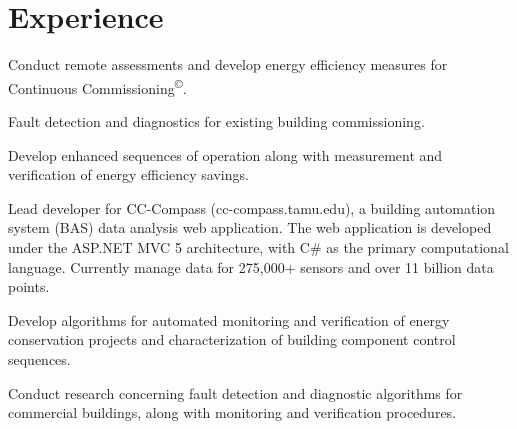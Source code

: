 \documentclass[]{deedy-resume-openfont}
\begin{document}
\begin{minipage}[t]{0.66\textwidth}


\section{Experience}

\sectionsep
\begin{tightemize}
\item Conduct remote assessments and develop energy efficiency measures for Continuous Commissioning\textsuperscript{\copyright{}}.
\item Fault detection and diagnostics for existing building commissioning.
\item Develop enhanced sequences of operation along with measurement and verification of energy efficiency savings.
\end{tightemize}

\vspace{0.1in}


\vspace{\topsep} %
\begin{tightemize}
\item Lead developer for CC-Compass (cc-compass.tamu.edu), a building automation system
(BAS) data analysis web application. The web application is developed under the ASP.NET
MVC 5 architecture, with C\# as the primary computational language. Currently manage
data for 275,000+ sensors and over 11 billion data points.
\item Develop algorithms for automated monitoring and verification of energy conservation projects and characterization of building component control sequences.
	\item Conduct research concerning fault detection and diagnostic algorithms for commercial buildings, along with monitoring and verification procedures.
\end{tightemize}
\sectionsep




\end{minipage}
\end{document}
